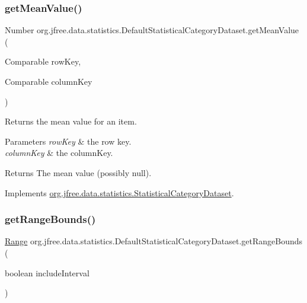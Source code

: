 \subsubsection{\texorpdfstring{get\+Mean\+Value()}{getMeanValue()}\hspace{0.1cm}{\footnotesize\ttfamily [2/2]}}
{\footnotesize\ttfamily Number org.\+jfree.\+data.\+statistics.\+Default\+Statistical\+Category\+Dataset.\+get\+Mean\+Value (\begin{DoxyParamCaption}\item[{Comparable}]{row\+Key,  }\item[{Comparable}]{column\+Key }\end{DoxyParamCaption})}

Returns the mean value for an item.


\begin{DoxyParams}{Parameters}
{\em row\+Key} & the row key. \\
\hline
{\em column\+Key} & the column\+Key.\\
\hline
\end{DoxyParams}
\begin{DoxyReturn}{Returns}
The mean value (possibly {\ttfamily null}). 
\end{DoxyReturn}


Implements \mbox{\hyperlink{interfaceorg_1_1jfree_1_1data_1_1statistics_1_1_statistical_category_dataset_a8f486f51f975cc13e728180bbbc7314a}{org.\+jfree.\+data.\+statistics.\+Statistical\+Category\+Dataset}}.

\mbox{\label{classorg_1_1jfree_1_1data_1_1statistics_1_1_default_statistical_category_dataset_ac3440b80805636d47b07b69ee1407b35}} 
\subsubsection{\texorpdfstring{get\+Range\+Bounds()}{getRangeBounds()}}
{\footnotesize\ttfamily \mbox{\hyperlink{classorg_1_1jfree_1_1data_1_1_range}{Range}} org.\+jfree.\+data.\+statistics.\+Default\+Statistical\+Category\+Dataset.\+get\+Range\+Bounds (\begin{DoxyParamCaption}\item[{boolean}]{include\+Interval }\end{DoxyParamCaption})}

